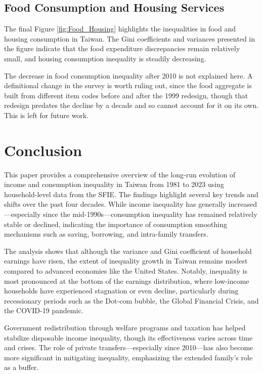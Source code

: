 \documentclass{article}
\begin{document}
\subsection{Food Consumption and Housing Services}

The final Figure \ref{fig:Food_Housing} highlights the inequalities in food and housing consumption in Taiwan. The Gini coefficients and variances presented in the figure indicate that the food expenditure discrepancies remain relatively small, and housing consumption inequality is steadily decreasing.

The decrease in food consumption inequality after 2010 is not explained here. A definitional change in the survey is worth ruling out, since the food aggregate is built from different item codes before and after the 1999 redesign, though that redesign predates the decline by a decade and so cannot account for it on its own. This is left for future work.


\section{Conclusion}
\label{sec:conclusion}

This paper provides a comprehensive overview of the long-run evolution of income and consumption inequality in Taiwan from 1981 to 2023 using household-level data from the SFIE. The findings highlight several key trends and shifts over the past four decades. While income inequality has generally increased—especially since the mid-1990s—consumption inequality has remained relatively stable or declined, indicating the importance of consumption smoothing mechanisms such as saving, borrowing, and intra-family transfers.

The analysis shows that although the variance and Gini coefficient of household earnings have risen, the extent of inequality growth in Taiwan remains modest compared to advanced economies like the United States. Notably, inequality is most pronounced at the bottom of the earnings distribution, where low-income households have experienced stagnation or even decline, particularly during recessionary periods such as the Dot-com bubble, the Global Financial Crisis, and the COVID-19 pandemic.

Government redistribution through welfare programs and taxation has helped stabilize disposable income inequality, though its effectiveness varies across time and crises. The role of private transfers—especially since 2010—has also become more significant in mitigating inequality, emphasizing the extended family's role as a buffer.
\end{document}
